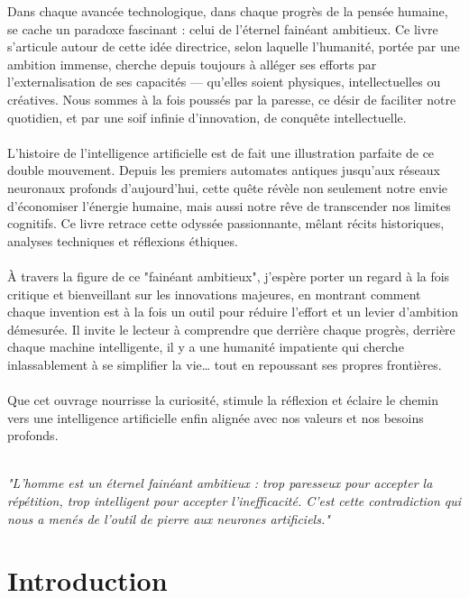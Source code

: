 \documentclass[12pt,a4paper]{book}
\begin{document}
Dans chaque avancée technologique, dans chaque progrès de la pensée humaine, se cache un paradoxe fascinant : celui de l'éternel fainéant ambitieux. Ce livre s'articule autour de cette idée directrice, selon laquelle l'humanité, portée par une ambition immense, cherche depuis toujours à alléger ses efforts par l'externalisation de ses capacités — qu'elles soient physiques, intellectuelles ou créatives. Nous sommes à la fois poussés par la paresse, ce désir de faciliter notre quotidien, et par une soif infinie d'innovation, de conquête intellectuelle.
\\ \\
L'histoire de l'intelligence artificielle est de fait une illustration parfaite de ce double mouvement. Depuis les premiers automates antiques jusqu'aux réseaux neuronaux profonds d'aujourd'hui, cette quête révèle non seulement notre envie d'économiser l'énergie humaine, mais aussi notre rêve de transcender nos limites cognitifs. Ce livre retrace cette odyssée passionnante, mêlant récits historiques, analyses techniques et réflexions éthiques.
\\ \\
À travers la figure de ce "fainéant ambitieux", j'espère porter un regard à la fois critique et bienveillant sur les innovations majeures, en montrant comment chaque invention est à la fois un outil pour réduire l'effort et un levier d'ambition démesurée. Il invite le lecteur à comprendre que derrière chaque progrès, derrière chaque machine intelligente, il y a une humanité impatiente qui cherche inlassablement à se simplifier la vie… tout en repoussant ses propres frontières.
\\ \\
Que cet ouvrage nourrisse la curiosité, stimule la réflexion et éclaire le chemin vers une intelligence artificielle enfin alignée avec nos valeurs et nos besoins profonds.
\\ \\
\begin{citationmd}
\centering\itshape\large
"L'homme est un éternel fainéant ambitieux : trop paresseux pour accepter la répétition, trop intelligent pour accepter l'inefficacité. C'est cette contradiction qui nous a menés de l'outil de pierre aux neurones artificiels."
\end{citationmd}

\newpage 

\tableofcontents

\newpage

\section{Introduction}
\end{document}
